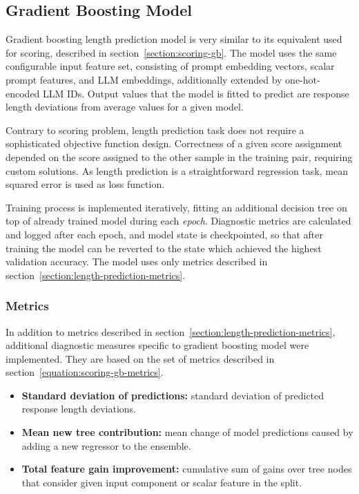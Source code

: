 \documentclass[a4paper,11pt,twoside]{report}
\theoremstyle{definition}
\begin{document}
\subsection{Gradient Boosting Model}

Gradient boosting length prediction model is very similar to its equivalent used for scoring, described in section~\ref{section:scoring-gb}. The model uses the same configurable input feature set, consisting of prompt embedding vectors, scalar prompt features, and LLM embeddings, additionally extended by one-hot-encoded LLM IDs. Output values that the model is fitted to predict are response length deviations from average values for a given model. 

Contrary to scoring problem, length prediction task does not require a sophisticated objective function design. Correctness of a given score assignment depended on the score assigned to the other sample in the training pair, requiring custom solutions. As length prediction is a straightforward regression task, mean squared error is used as loss function.

Training process is implemented iteratively, fitting an additional decision tree on top of already trained model during each \textit{epoch}. Diagnostic metrics are calculated and logged after each epoch, and model state is checkpointed, so that after training the model can be reverted to the state which achieved the highest validation accuracy. The model uses only metrics described in section~\ref{section:length-prediction-metrics}.

\subsubsection{Metrics}

In addition to metrics described in section~\ref{section:length-prediction-metrics}, additional diagnostic measures specific to gradient boosting model were implemented. They are based on the set of metrics described in section~\ref{equation:scoring-gb-metrics}.

\begin{itemize}
    \item \textbf{Standard deviation of predictions:} standard deviation of predicted response length deviations.
    \item \textbf{Mean new tree contribution:} mean change of model predictions caused by adding a new regressor to the ensemble.
    \item \textbf{Total feature gain improvement:} cumulative sum of gains over tree nodes that consider given input component or scalar feature in the split.
\end{itemize}
\end{document}
